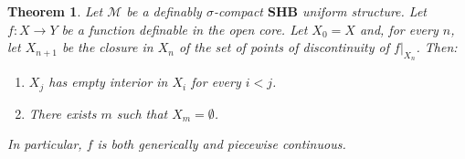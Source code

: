 \documentclass[12pt]{article}
\newcommand{\Mm}{\mathcal{M}}
\newcommand{\Ff}{\mathcal{F}}
\newcommand{\BP}{\textbf{SHB}}
\newtheorem{theorem}{Theorem}[section] %
\theoremstyle{definition}
\theoremstyle{remark}
\begin{document}

\begin{theorem} \label{thm:f-BP}
Let $\Mm$ be a definably $\sigma$-compact $\BP$ uniform structure. Let $f:X\rightarrow Y$ be a function definable in the open core. Let $X_0=X$ and, for every $n$, let $X_{n+1}$ be the closure in $X_n$ of the set of points of discontinuity of $f|_{X_n}$. Then:
\begin{enumerate}
     \item $X_j$ has empty interior in $X_i$ for every $i<j$.
     \item There exists $m$ such that $X_m=\emptyset$.   
\end{enumerate}
In particular, $f$ is both generically and piecewise continuous. 
\end{theorem}
\end{document}
